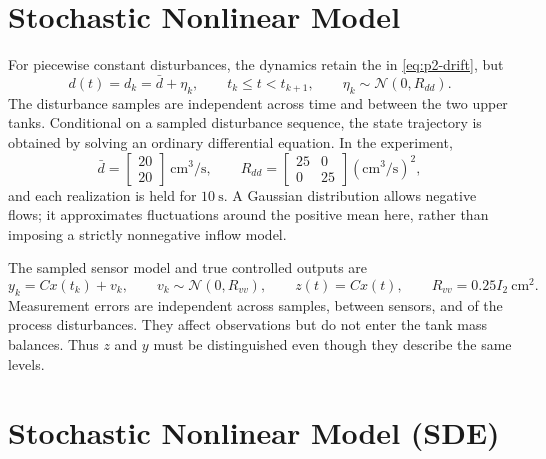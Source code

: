 \section{Stochastic Nonlinear Model}

For piecewise constant disturbances, the dynamics retain the  in
\eqref{eq:p2-drift}, but
\begin{equation}
 d(t)=d_k=\bar d+\eta_k,\qquad t_k\leq t<t_{k+1},\qquad
 \eta_k\sim\mathcal N(0,R_{dd}).
\end{equation}
The disturbance samples are independent across time and between the two
upper tanks. Conditional on a sampled disturbance sequence, the state
trajectory is obtained by solving an ordinary differential equation.
In the experiment,
\begin{equation}
 \bar d=\begin{bmatrix}20\\20\end{bmatrix}\ \mathrm{cm^3/s},\qquad
 R_{dd}=\begin{bmatrix}25&0\\0&25\end{bmatrix}(\mathrm{cm^3/s})^2,
\end{equation}
and each realization is held for $10\ \mathrm{s}$. A Gaussian distribution
allows negative flows; it approximates fluctuations around the positive
mean here, rather than imposing a strictly nonnegative inflow model.

The sampled sensor model and true controlled outputs are
\begin{equation}
 y_k=Cx(t_k)+v_k,\qquad v_k\sim\mathcal N(0,R_{vv}),\qquad
 z(t)=Cx(t),\qquad R_{vv}=0.25I_2\ \mathrm{cm^2}.
 \label{eq:p2-noisy-sensor}
\end{equation}
Measurement errors are independent across samples, between sensors, and
of the process disturbances. They affect observations but do not enter
the tank mass balances. Thus $z$ and $y$ must be distinguished even though
they describe the same levels.

\section{Stochastic Nonlinear Model (SDE)}

